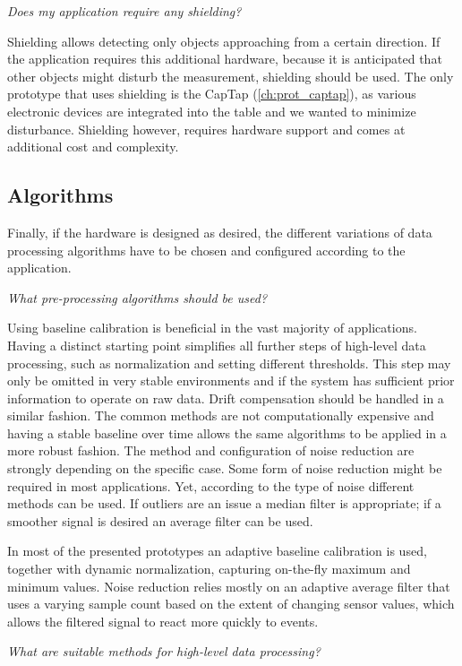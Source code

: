 \textit{Does my application require any shielding?}

Shielding allows detecting only objects approaching from a certain direction. If the application requires this additional hardware, because it is anticipated that other objects might disturb the measurement, shielding should be used. The only prototype that uses shielding is the CapTap (\ref{ch:prot_captap}), as various electronic devices are integrated into the table and we wanted to minimize disturbance. Shielding however, requires hardware support and comes at additional cost and complexity.

\subsection{Algorithms}
Finally, if the hardware is designed as desired, the different variations of data processing algorithms have to be chosen and configured according to the application.

\textit{What pre-processing algorithms should be used?}

Using baseline calibration is beneficial in the vast majority of applications. Having a distinct starting point simplifies all further steps of high-level data processing, such as normalization and setting different thresholds. This step may only be omitted in very stable environments and if the system has sufficient prior information to operate on raw data. Drift compensation should be handled in a similar fashion. The common methods are not computationally expensive and having a stable baseline over time allows the same algorithms to be applied in a more robust fashion. The method and configuration of noise reduction are strongly depending on the specific case. Some form of noise reduction might be required in most applications. Yet, according to the type of noise different methods can be used. If outliers are an issue a median filter is appropriate; if a smoother signal is desired an average filter can be used. 

In most of the presented prototypes an adaptive baseline calibration is used, together with dynamic normalization, capturing on-the-fly maximum and minimum values. Noise reduction relies mostly on an adaptive average filter that uses a varying sample count based on the extent of changing sensor values, which allows the filtered signal to react more quickly to events.

\textit{What are suitable methods for high-level data processing?}

